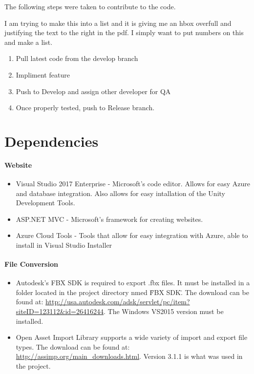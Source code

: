 The following steps were taken to contribute to the code.
	
I am trying to make this into a list and it is giving me an hbox overfull and justifying the text to the right in the pdf. I simply want to put numbers on this and make a list.

\begin{enumerate}

\item Pull latest code from the develop branch
\item Impliment feature
\item Push to Develop and assign other developer for QA
\item Once properly tested, push to Release branch.

\end{enumerate}

\section{Dependencies}
\paragraph{Website}
\begin{itemize}
    \item Visual Studio 2017 Enterprise - Microsoft's code editor. Allows for easy Azure and database
    integration. Also allows for easy intallation of the Unity Development Tools.
    \item ASP.NET MVC - Microsoft's framework for creating websites.
    \item Azure Cloud Tools - Tools that allow for easy integration with Azure, able to install in Visual Studio Installer
\end{itemize}

\paragraph{File Conversion}
\begin{itemize}
    \item Autodesk's FBX SDK is required to export .fbx files.  It must be installed in a folder located in the project directory nmed \"FBX SDK\".  The download can be found at: 
    \url{http://usa.autodesk.com/adsk/servlet/pc/item?siteID=123112&id=26416244}.
    The Windows VS2015 version must be installed.

    \item Open Asset Import Library supports a wide variety of import and export file types.  The download can be found at: \url{http://assimp.org/main_downloads.html}.  Version 3.1.1 is what was used in the project.         
\end{itemize}

